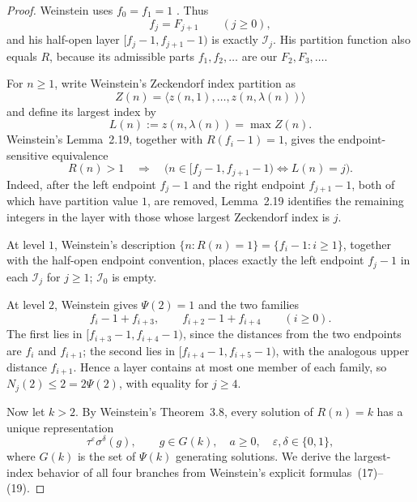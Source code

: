 \begin{proof}
Weinstein uses \(f_0=f_1=1\)
\cite[Secs.~3 and~5]{Weinstein2016}.  Thus
\[
 f_j=F_{j+1}\qquad(j\ge0),
\]
and his half-open layer \([f_j-1,f_{j+1}-1)\) is exactly
\(\mathcal I_j\).  His partition function also equals \(R\), because its
admissible parts \(f_1,f_2,\ldots\) are our \(F_2,F_3,\ldots\).

For \(n\ge1\), write Weinstein's Zeckendorf index partition as
\[
 Z(n)=\langle z(n,1),\ldots,z(n,\lambda(n))\rangle
\]
and define its largest index by
\[
 L(n):=z(n,\lambda(n))=\max Z(n).
\]
Weinstein's Lemma~2.19, together with
\(R(f_i-1)=1\), gives the endpoint-sensitive equivalence
\begin{equation}
 R(n)>1\quad\Longrightarrow\quad
 \bigl(n\in[f_j-1,f_{j+1}-1)\iff L(n)=j\bigr).
 \label{eq:layer-largest-index}
\end{equation}
Indeed, after the left endpoint \(f_j-1\) and the right endpoint
\(f_{j+1}-1\), both of which have partition value \(1\), are removed,
Lemma~2.19 identifies the remaining integers in the layer with those whose
largest Zeckendorf index is \(j\).

At level \(1\), Weinstein's description
\(\{n:R(n)=1\}=\{f_i-1:i\ge1\}\), together with the half-open endpoint
convention, places exactly the left endpoint \(f_j-1\) in each
\(\mathcal I_j\) for \(j\ge1\); \(\mathcal I_0\) is empty.

At level \(2\), Weinstein gives \(\Psi(2)=1\) and the two families
\[
 f_i-1+f_{i+3},\qquad f_{i+2}-1+f_{i+4}\qquad(i\ge0).
\]
The first lies in \([f_{i+3}-1,f_{i+4}-1)\), since the distances from
the two endpoints are \(f_i\) and \(f_{i+1}\); the second lies in
\([f_{i+4}-1,f_{i+5}-1)\), with the analogous upper distance
\(f_{i+1}\).  Hence a layer contains at most one member of each family,
so \(N_j(2)\le2=2\Psi(2)\), with equality for \(j\ge4\).

Now let \(k>2\).  By Weinstein's Theorem~3.8, every solution of
\(R(n)=k\) has a unique representation
\begin{equation}
 [a]\tau^\varepsilon\sigma^\delta(g),
 \qquad
 g\in G(k),\quad a\ge0,\quad \varepsilon,\delta\in\{0,1\},
 \label{eq:weinstein-orbit-normal-form}
\end{equation}
where \(G(k)\) is the set of \(\Psi(k)\) generating solutions.  We derive the
largest-index behavior of all four branches from Weinstein's explicit
formulas~(17)--(19).


\end{proof}
